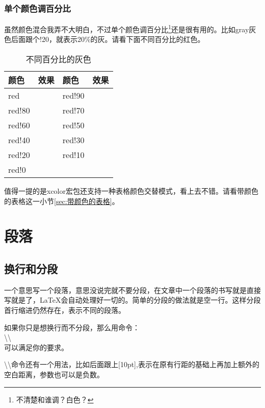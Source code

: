 \documentclass[11pt,oneside]{book}
\begin{document}
  \subsection{单个颜色调百分比}
  虽然颜色混合我弄不大明白，不过单个颜色调百分比\footnote{不清楚和谁调？白色？}还是很有用的。比如gray灰色后面跟个!20，就表示20\%的灰。请看下面不同百分比的红色。
  \begin{table}[H]
    \centering
    \begin{tabular}{@{}lp{50pt}lp{50pt}@{}}
      \toprule
      颜色        & 效果  & 颜色       & 效果\\ \midrule
      red     &  \cellcolor{red}  & red!90     &    \cellcolor{red!90} \\
      red!80      &   \cellcolor{red!80} & red!70    &   \cellcolor{red!70}\\
      red!60     &  \cellcolor{red!60}  & red!50      &   \cellcolor{red!50}\\
      red!40      &   \cellcolor{red!40} & red!30    &   \cellcolor{red!30}\\
      red!20  &  \cellcolor{red!20} &red!10       &   \cellcolor{red!10}  \\
      red!0    &    \cellcolor{red!0}\\ \bottomrule
    \end{tabular}
    \label{tab:不同百分比的灰色}
    \caption{不同百分比的灰色}
  \end{table}


  值得一提的是xcolor宏包还支持一种表格颜色交替模式，看上去不错。请看带颜色的表格这一小节\ref{sec:带颜色的表格}。



  \chapter{段落}
  \section{换行和分段}
  一个意思写一个段落，意思没说完就不要分段，在文章中一个段落的书写就是直接写就是了，\LaTeX 会自动处理好一切的。简单的分段的做法就是空一行。这样分段首行缩进仍然存在，表示不同的段落。

  如果你只是想换行而不分段，那么用命令：\\
  \textbackslash \textbackslash \\
  可以满足你的要求。

  \textbackslash \textbackslash 命令还有一个用法，比如后面跟上[10pt],表示在原有行距的基础上再加上额外的空白距离，参数也可以是负数。
\end{document}
